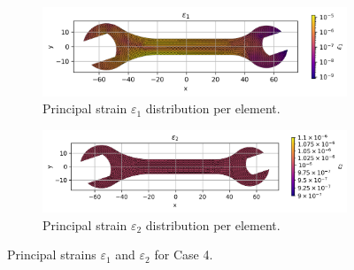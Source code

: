 \begin{figure}[H]
    \centering
    \begin{subfigure}[t]{0.49\textwidth}
        \centering
        \includegraphics[width=\textwidth]{GRAFICOS/Case d - epsilon_1_per_element.png}
        \caption{Principal strain $\varepsilon_1$ distribution per element.}
        \label{fig:epsilon_1_d}
    \end{subfigure}
    \hfill
    \begin{subfigure}[t]{0.49\textwidth}
        \centering
        \includegraphics[width=\textwidth]{GRAFICOS/Case d - epsilon_2_per_element.png}
        \caption{Principal strain $\varepsilon_2$ distribution per element.}
        \label{fig:epsilon_2_d}
    \end{subfigure}
    \caption{Principal strains $\varepsilon_1$ and $\varepsilon_2$ for Case 4.}
    \label{fig:principal_strains_d}
\end{figure}

